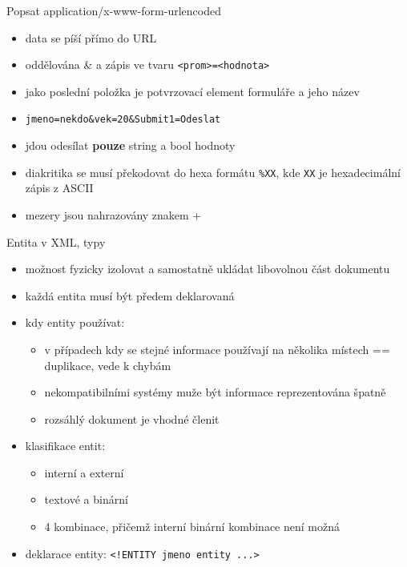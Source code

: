 \documentclass[12pt,a4paper,titlepage,final]{article}
\begin{document}
\begin{enumerate}
	{\large \item Popsat application/x-www-form-urlencoded}
	\begin{itemize}
		\item data se píší přímo do URL
		\item oddělována \& a zápis ve tvaru \texttt{<prom>=<hodnota>} 
		\item jako poslední položka je potvrzovací element formuláře a jeho název
		\item \texttt{jmeno=nekdo\&vek=20\&Submit1=Odeslat} 
		\item jdou odesílat \textbf{pouze} string a bool hodnoty
		\item diakritika se musí překodovat do hexa formátu \texttt{\%XX}, kde \texttt{XX} je hexadecimální zápis z ASCII
		\item mezery jsou nahrazovány znakem +
	\end{itemize}
	
	{\large \item Entita v XML, typy }
	\begin{itemize}
		\item možnost fyzicky izolovat a samostatně ukládat libovolnou část dokumentu
		\item každá entita musí být předem deklarovaná
		\item kdy entity používat:
		\begin{itemize}
			\item v případech kdy se stejné informace používají na několika místech == duplikace, vede k chybám
			\item nekompatibilními systémy muže být informace reprezentována špatně
			\item rozsáhlý dokument je vhodné členit	
		\end{itemize}	
		\item klasifikace entit:
		\begin{itemize}
			\item interní a externí
			\item textové a binární	
			\item 4 kombinace, přičemž interní binární kombinace není možná
		\end{itemize}
		
		\item deklarace entity: \texttt{<!ENTITY jmeno entity ...>} 
	\end{itemize}
	

\end{enumerate}
\end{document}
